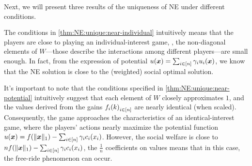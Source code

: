 


Next, we will present three results of the uniqueness of NE under different conditions.





\begin{remark}
\label{rmk:NE:unique:near-individual}
The conditions in \cref{thm:NE:unique:near-individual} intuitively means that the players are close to playing an individual-interest game, \ie, the non-diagonal elements of $W$---those describe the interactions among different players---are small enough. In fact, from the expression of potential $u({\bm{x}}) = \sum_{i\in[n]} \gamma_i u_i({\bm{x}})$, we know that the NE solution is close to the (weighted) social optimal solution.
\end{remark}



\begin{remark}
\label{rmk:NE:unique:near-potential}
It's important to note that the conditions specified in \cref{thm:NE:unique:near-potential} intuitively suggest that each element of $W$ closely approximates $1$, and the values derived from the gains ${f_i(k)}_{i\in[n]}$ are nearly identical (when scaled). Consequently, the game approaches the characteristics of an identical-interest game, where the players' actions nearly maximize the potential function $u({\bm{x}}) = f(\| {\bm{x}} \|_1) - \sum_{i\in[n]} \gamma_i c_i(x_i)$.
However, the social welfare is close to $n f(\| {\bm{x}} \|_1) - \sum_{i\in[n]} \gamma_i c_i(x_i)$, the $\frac{1}{n}$ coefficients on values means that in this case, the free-ride phenomenon can occur.
\end{remark}



